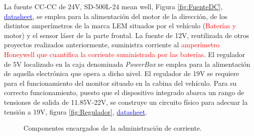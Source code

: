 La fuente CC-CC de 24V, SD-500L-24 mean well, Figura \ref{fig:FuenteDC}, \href{https://github.com/ual-arm/ual-ecar-docs/blob/master/Datasheet/MeanWell_SD-500L-24.pdf}{\textcolor{blue}{datasheet}}, se emplea para la alimentación del motor de la dirección, de los distintos amperímetros de la marca LEM situados por el vehículo (\textcolor{red}{Baterías y} motor) y el sensor láser de la parte frontal. La fuente de 12V, reutilizada de otros proyectos realizados anteriormente, suministra corriente al \textcolor{red}{amperímetro Honeywell que cuantifica la corriente suministrada por las baterías}. El regulador de 5V localizado en la caja denominada \textit{PowerBox} se emplea para la alimentación de aquella electrónica que opera a dicho nivel. El regulador de 19V se requiere para el funcionamiento del monitor situado en la cabina del vehículo. Para su correcto funcionamiento, puesto que el dispositivo integrado abarca un rango de tensiones de salida de 11.85V-22V, se construye un circuito físico para adecuar la tensión a 19V, figura \ref{fig:Regulador}, \href{https://github.com/ual-arm/ual-ecar-docs/blob/master/Datasheet/Regulador-ptn78000h.pdf}{\textcolor{blue}{datasheet}}.

\begin{figure}[!ht]
\begin{center}
	\caption{Componentes encargados de la administración de corriente.}
\end{center}
\end{figure}

